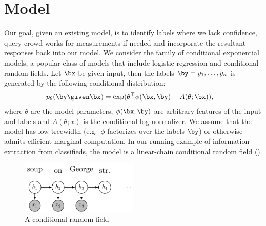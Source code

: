 \section{Model}
\label{sec:model}




Our goal, given an existing model, is to identify labels where we lack confidence, query crowd works for measurements if needed and incorporate the resultant responses back into our model.
We consider the family of conditional exponential models, a popular class of models that include logistic regression and conditional random fields.
Let $\bx$ be given input, then the labels $\by = y_1, \ldots, y_n$ is generated by the following conditional distribution:
\begin{align*}
  \p(\by \given \bx) 
  &= \exp( \theta^\top \phi(\bx, \by) - A(\theta; \bx)),
\end{align*}
where $\theta$ are the model parameters, $\phi(\bx, \by)$ are arbitrary features of the input and labels and $A(\theta; x)$ is the conditional log-normalizer.
We assume that the model has low treewidth (e.g.\ $\phi$ factorizes over the labels $\by$) or otherwise admits efficient marginal computation.
In our running example of information extraction from classifieds, the model is a linear-chain conditional random field ().


\begin{figure}[t]
  \begin{centering}
  \includegraphics[width=0.5\textwidth]{figures/simple-crf.pdf}
  \end{centering}
  \caption{A conditional random field }
  \label{fig:crf}
\end{figure}

